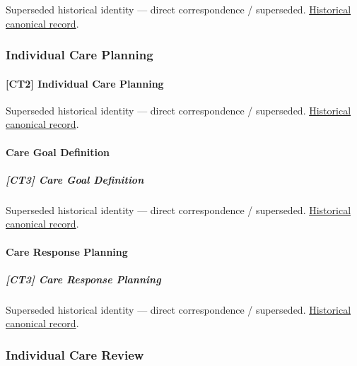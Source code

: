 \par\label{element:958345ee65f446d3b1259b8895ab100f}
Superseded historical identity — direct correspondence / superseded. \href{../../../../continuum/strategy/capability/958345ee65f446d3b1259b8895ab100f.md}{Historical canonical record}.\par

\subsubsection{Individual Care Planning}

\paragraph{[CT2] Individual Care Planning}

\par\label{element:574e61e230e643f78c58649adb4db313}
Superseded historical identity — direct correspondence / superseded. \href{../../../../continuum/strategy/capability/574e61e230e643f78c58649adb4db313.md}{Historical canonical record}.\par

\paragraph{Care Goal Definition}

\subparagraph{[CT3] Care Goal Definition}

\par\label{element:8bfbcc0a455d423c90ae2f1cfb732ca8}
Superseded historical identity — direct correspondence / superseded. \href{../../../../continuum/strategy/capability/8bfbcc0a455d423c90ae2f1cfb732ca8.md}{Historical canonical record}.\par

\paragraph{Care Response Planning}

\subparagraph{[CT3] Care Response Planning}

\par\label{element:d64569acaf2c44f3b2a5332f74fff7c7}
Superseded historical identity — direct correspondence / superseded. \href{../../../../continuum/strategy/capability/d64569acaf2c44f3b2a5332f74fff7c7.md}{Historical canonical record}.\par

\subsubsection{Individual Care Review}

